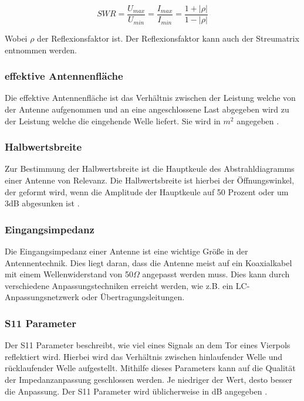 \begin{equation}
	SWR=\frac{U_{max}}{U_{min}}=\frac{I_{max}}{I_{min}}=\frac{1+\lvert \rho \lvert}{1-\lvert \rho \lvert}
\end{equation}

Wobei $\rho$ der Reflexionsfaktor ist. Der Reflexionsfaktor kann auch der Streumatrix entnommen werden.

\subsubsection{effektive Antennenfläche}
Die effektive Antennenfläche ist das Verhältnis zwischen der Leistung welche von der Antenne aufgenommen und an eine angeschlossene Last abgegeben wird zu der Leistung welche die eingehende Welle liefert. Sie wird in $m^2$ angegeben \cite[p. 29]{Kraus-2002-AntennasB,effective_aperture}.

\subsubsection{Halbwertsbreite}
Zur Bestimmung der Halbwertsbreite ist die Hauptkeule des Abstrahldiagramms einer Antenne von Relevanz. Die Halbwertsbreite ist hierbei der Öffnungswinkel, der geformt wird, wenn die Amplitude der Hauptkeule auf 50 Prozent oder um 3dB abgesunken ist \cite{half-power-beam-width}.

\subsubsection{Eingangsimpedanz}
Die Eingangsimpedanz einer Antenne ist eine wichtige Größe in der Antennentechnik. Dies liegt daran, dass die Antenne meist auf ein Koaxialkabel mit einem Wellenwiderstand von 50$\Omega$ angepasst werden muss. Dies kann durch verschiedene Anpassungstechniken erreicht werden, wie z.B. ein LC-Anpassungsnetzwerk oder Übertragungsleitungen. 

\subsubsection{S11 Parameter}
Der S11 Parameter beschreibt, wie viel eines Signals an dem Tor eines Vierpols reflektiert wird. Hierbei wird das Verhältnis zwischen hinlaufender Welle und rücklaufender Welle aufgestellt. Mithilfe dieses Parameters kann auf die Qualität der Impedanzanpassung geschlossen werden. Je niedriger der Wert, desto besser die Anpassung. Der S11 Parameter wird üblicherweise in dB angegeben \cite{noauthor_streuparameter_2023}.

